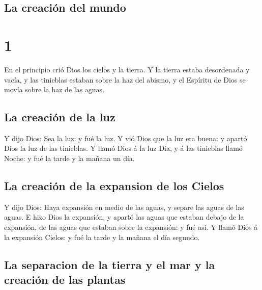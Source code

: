 \hypertarget{la-creaciuxf3n-del-mundo}{%
\subsection{La creación del mundo}\label{la-creaciuxf3n-del-mundo}}

\hypertarget{section-01-1}{%
\section{1}\label{section-01-1}}

 En el principio crió Dios los cielos y la tierra.
 Y la tierra estaba desordenada y vacía, y las tinieblas
estaban sobre la haz del abismo, y el Espíritu de Dios se movía sobre la
haz de las aguas.

\hypertarget{la-creaciuxf3n-de-la-luz}{%
\subsection{La creación de la luz}\label{la-creaciuxf3n-de-la-luz}}

 Y dijo Dios: Sea la luz: y fué la luz.  Y
vió Dios que la luz era buena: y apartó Dios la luz de las tinieblas.
 Y llamó Dios á la luz Día, y á las tinieblas llamó Noche:
y fué la tarde y la mañana un día.

\hypertarget{la-creaciuxf3n-de-la-expansion-de-los-cielos}{%
\subsection{La creación de la expansion de los
Cielos}\label{la-creaciuxf3n-de-la-expansion-de-los-cielos}}

 Y dijo Dios: Haya expansión en medio de las aguas, y
separe las aguas de las aguas.  E hizo Dios la expansión,
y apartó las aguas que estaban debajo de la expansión, de las aguas que
estaban sobre la expansión: y fué así.  Y llamó Dios á la
expansión Cielos: y fué la tarde y la mañana el día segundo.

\hypertarget{la-separacion-de-la-tierra-y-el-mar-y-la-creaciuxf3n-de-las-plantas}{%
\subsection{La separacion de la tierra y el mar y la creación de las
plantas}\label{la-separacion-de-la-tierra-y-el-mar-y-la-creaciuxf3n-de-las-plantas}}

